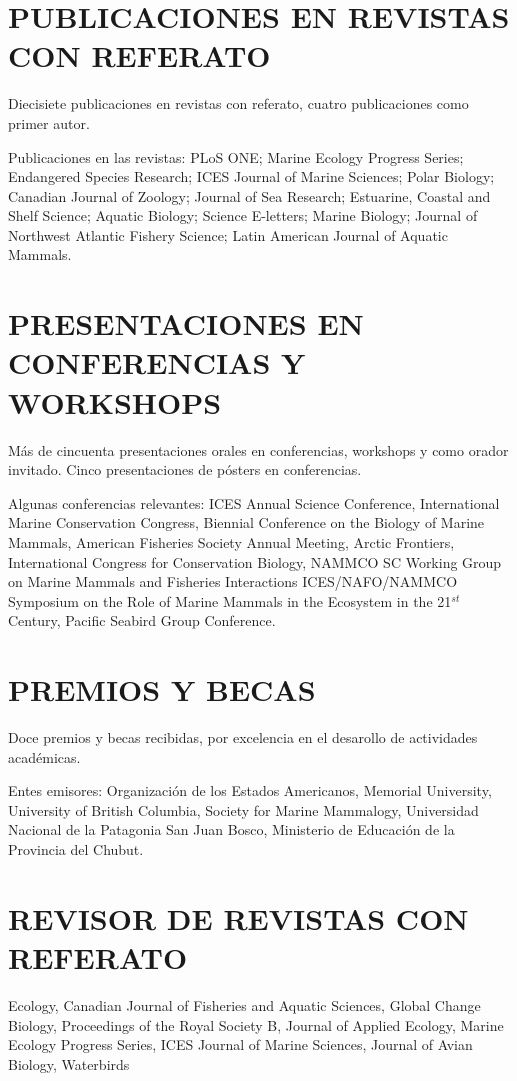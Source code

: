 \documentclass{res}
\begin{document}
\begin{resume}
\section{PUBLICACIONES EN REVISTAS CON REFERATO} 

Diecisiete publicaciones en revistas con referato, cuatro publicaciones como primer autor. 

Publicaciones en las revistas: PLoS ONE; Marine Ecology Progress Series; Endangered Species Research; ICES Journal of Marine Sciences; Polar Biology; Canadian Journal of Zoology; Journal of Sea Research; Estuarine, Coastal and Shelf Science; Aquatic Biology; Science E-letters; Marine Biology; Journal of Northwest Atlantic Fishery Science; Latin American Journal of Aquatic Mammals.

\section{PRESENTACIONES EN CONFERENCIAS Y WORKSHOPS}


M\'as de cincuenta presentaciones orales en conferencias, workshops y como orador invitado. Cinco presentaciones de p\'osters en conferencias.

Algunas conferencias relevantes: ICES Annual Science Conference,  International Marine Conservation Congress, Biennial Conference on the Biology of Marine Mammals, American Fisheries Society Annual Meeting, Arctic Frontiers, International Congress for Conservation Biology, NAMMCO SC Working Group on Marine Mammals and Fisheries Interactions ICES/NAFO/NAMMCO Symposium on the Role of Marine Mammals in the Ecosystem in the 21$^{st}$ Century, Pacific Seabird Group Conference.



\section{PREMIOS Y BECAS}
Doce premios y becas recibidas, por excelencia en el desarollo de actividades acad\'emicas. 

Entes emisores: Organizaci\'on de los Estados Americanos, Memorial University, University of British Columbia, Society for Marine Mammalogy, Universidad Nacional de la Patagonia San Juan Bosco, Ministerio de Educaci\'on de la Provincia del Chubut.



\section{REVISOR DE REVISTAS CON REFERATO}

Ecology, Canadian Journal of Fisheries and Aquatic Sciences, Global Change Biology, Proceedings of the Royal Society B, Journal of Applied Ecology, Marine Ecology Progress Series, ICES Journal of Marine Sciences, Journal of Avian Biology, Waterbirds


\end{resume}
\end{document}
